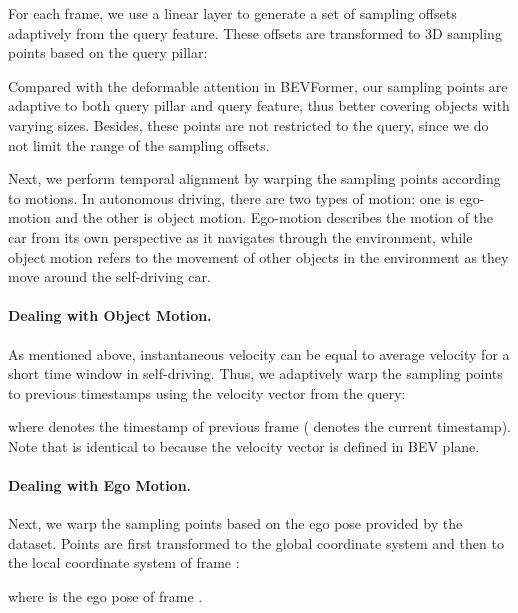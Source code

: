 \documentclass[10pt,twocolumn,letterpaper]{article}
\begin{document}
For each frame, we use a linear layer to generate a set of sampling offsets  adaptively from the query feature. These offsets are transformed to 3D sampling points based on the query pillar:



Compared with the deformable attention in BEVFormer, our sampling points are adaptive to both query pillar and query feature, thus better covering objects with varying sizes. Besides, these points are not restricted to the query, since we do not limit the range of the sampling offsets.

Next, we perform temporal alignment by warping the sampling points according to motions. In autonomous driving, there are two types of motion: one is ego-motion and the other is object motion. Ego-motion describes the motion of the car from its own perspective as it navigates through the environment, while object motion refers to the movement of other objects in the environment as they move around the self-driving car.

\vspace{-5pt}
\paragraph{Dealing with Object Motion.} As mentioned above, instantaneous velocity can be equal to average velocity for a short time window in self-driving. Thus, we adaptively warp the sampling points to previous timestamps using the velocity vector  from the query:

where  denotes the timestamp of previous frame  ( denotes the current timestamp). Note that  is identical to  because the velocity vector is defined in BEV plane.

\vspace{-5pt}
\paragraph{Dealing with Ego Motion.} Next, we warp the sampling points based on the ego pose provided by the dataset. Points are first transformed to the global coordinate system and then to the local coordinate system of frame :

where  is the ego pose of frame .
\end{document}
